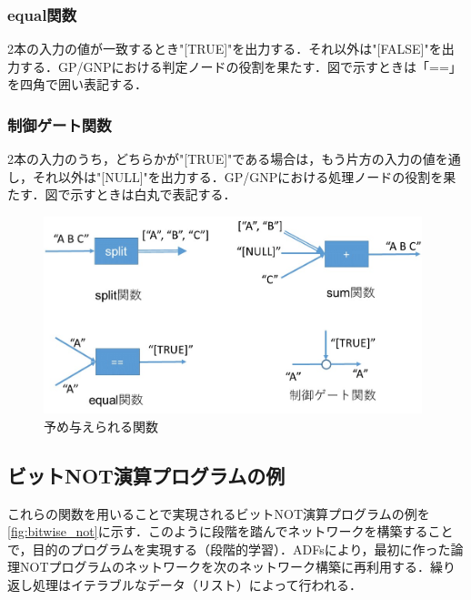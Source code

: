 \documentclass[exploratorypaper]{jsaiart} %
\begin{document}
\subsubsection{equal関数}
2本の入力の値が一致するとき"[TRUE]"を出力する．それ以外は"[FALSE]"を出力する．GP/GNPにおける判定ノードの役割を果たす．図で示すときは「==」を四角で囲い表記する．

\subsubsection{制御ゲート関数}
2本の入力のうち，どちらかが"[TRUE]"である場合は，もう片方の入力の値を通し，それ以外は"[NULL]"を出力する．GP/GNPにおける処理ノードの役割を果たす．図で示すときは白丸で表記する．

\begin{figure}[t]
    \begin{center}
        \includegraphics[width=110mm]{func.jpg}
    \end{center}
    \capwidth=90mm %
    \caption{予め与えられる関数}
    \label{fig:func}
\end{figure}

\subsection{ビットNOT演算プログラムの例}
これらの関数を用いることで実現されるビットNOT演算プログラムの例を\ref{fig:bitwise_not}に示す．このように段階を踏んでネットワークを構築することで，目的のプログラムを実現する（段階的学習）．ADFsにより，最初に作った論理NOTプログラムのネットワークを次のネットワーク構築に再利用する．繰り返し処理はイテラブルなデータ（リスト）によって行われる．
\end{document}
